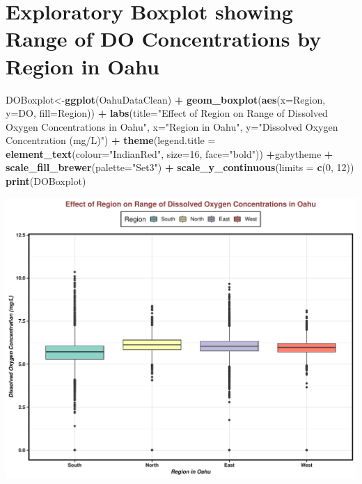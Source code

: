 \documentclass[12pt,]{article}
\newenvironment{Shaded}{\begin{snugshade}}{\end{snugshade}}
\newcommand{\KeywordTok}[1]{\textcolor[rgb]{0.13,0.29,0.53}{\textbf{#1}}}
\newcommand{\DataTypeTok}[1]{\textcolor[rgb]{0.13,0.29,0.53}{#1}}
\newcommand{\DecValTok}[1]{\textcolor[rgb]{0.00,0.00,0.81}{#1}}
\newcommand{\StringTok}[1]{\textcolor[rgb]{0.31,0.60,0.02}{#1}}
\newcommand{\OperatorTok}[1]{\textcolor[rgb]{0.81,0.36,0.00}{\textbf{#1}}}
\newcommand{\NormalTok}[1]{#1}
\begin{document}
\section{Exploratory Boxplot showing Range of DO Concentrations by
Region in
Oahu}\label{exploratory-boxplot-showing-range-of-do-concentrations-by-region-in-oahu}

\begin{Shaded}
\begin{Highlighting}[]
\NormalTok{DOBoxplot<-}\KeywordTok{ggplot}\NormalTok{(OahuDataClean) }\OperatorTok{+}\StringTok{ }
\StringTok{  }\KeywordTok{geom_boxplot}\NormalTok{(}\KeywordTok{aes}\NormalTok{(}\DataTypeTok{x=}\NormalTok{Region, }\DataTypeTok{y=}\NormalTok{DO, }\DataTypeTok{fill=}\NormalTok{Region))  }\OperatorTok{+}
\StringTok{  }\KeywordTok{labs}\NormalTok{(}\DataTypeTok{title=}\StringTok{"Effect of Region on Range of Dissolved Oxygen Concentrations in Oahu"}\NormalTok{, }\DataTypeTok{x=}\StringTok{"Region in Oahu"}\NormalTok{, }\DataTypeTok{y=}\StringTok{"Dissolved Oxygen Concentration (mg/L)"}\NormalTok{) }\OperatorTok{+}
\KeywordTok{theme}\NormalTok{(}\DataTypeTok{legend.title =} \KeywordTok{element_text}\NormalTok{(}\DataTypeTok{colour=}\StringTok{"IndianRed"}\NormalTok{, }\DataTypeTok{size=}\DecValTok{16}\NormalTok{, }\DataTypeTok{face=}\StringTok{"bold"}\NormalTok{)) }\OperatorTok{+}\NormalTok{gabytheme }\OperatorTok{+}
\KeywordTok{scale_fill_brewer}\NormalTok{(}\DataTypeTok{palette=}\StringTok{"Set3"}\NormalTok{) }\OperatorTok{+}
\StringTok{  }\KeywordTok{scale_y_continuous}\NormalTok{(}\DataTypeTok{limits =} \KeywordTok{c}\NormalTok{(}\DecValTok{0}\NormalTok{, }\DecValTok{12}\NormalTok{))}
 \KeywordTok{print}\NormalTok{(DOBoxplot)}
\end{Highlighting}
\end{Shaded}

\includegraphics{Garcia_ENV872_Project_files/figure-latex/unnamed-chunk-56-1.pdf}
\end{document}
